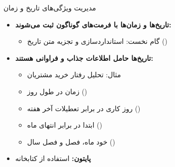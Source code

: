\begin{frame}{مدیریت ویژگی‌های تاریخ و زمان}
\begin{itemize}
  \item \textbf{تاریخ‌ها و زمان‌ها با فرمت‌های گوناگون ثبت می‌شوند:}
  \begin{itemize}
    \item گام نخست: استانداردسازی و تجزیه متن تاریخ ()
  \end{itemize}
  \vspace{0.2cm}
  \item \textbf{تاریخ‌ها حامل اطلاعات جذاب و فراوانی هستند:}
  \begin{itemize}
    \item مثال: تحلیل رفتار خرید مشتریان
    \item زمان در طول روز ()
    \item روز کاری در برابر تعطیلات آخر هفته ()
    \item ابتدا در برابر انتهای ماه ()
    \item خود ماه، فصل و فصل سال ()
  \end{itemize}
  \vspace{0.2cm}
  \item \textbf{پایتون:} استفاده از کتابخانه 
\end{itemize}
\end{frame}
